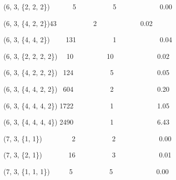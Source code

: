 \documentclass{article}
\newenvironment{tmparmod}[3]{\begin{list}{}{\setlength{\topsep}{0pt}\setlength{\leftmargin}{#1}\setlength{\rightmargin}{#2}\setlength{\parindent}{#3}\setlength{\listparindent}{\parindent}\setlength{\itemindent}{\parindent}\setlength{\parsep}{\parskip}} \item[]}{\end{list}}
\begin{document}
\begin{tmparmod}{0pt}{0pt}{0tab}
\begin{tmbothlined}
{{    {\hspace{3em}}(6, 3, \{2, 2, 2\}) \ \ \ \ \ \ {\hspace{4em}}5 \ \ \ \ \ \
    \ \ \ \ 5 \ \ \ \ \ \ \ \ \ \ \ \ 0.00
    
    {\hspace{3em}}(6, 3, \{4, 2, 2\}){\hspace{7em}}43 \ \ \ \ \ \ \ \ \ \ 2 \
    \ \ \ \ \ \ \ \ \ \ \ 0.02
    
    {\hspace{3em}}(6, 3, \{4, 4, 2\}) \ \ \ \ {\hspace{4em}}131 \ \ \ \ \ \ \
    \ \ \ 1 \ \ \ \ \ \ \ \ \ \ \ \ 0.04
    
    {\hspace{3em}}(6, 3, \{2, 2, 2, 2\}) \ \ {\hspace{4em}}10 \ \ \ \ \ \ \ \
    \ 10 \ \ \ \ \ \ \ \ \ \ \ \ 0.02
    
    {\hspace{3em}}(6, 3, \{4, 2, 2, 2\}) \ {\hspace{4em}}124 \ \ \ \ \ \ \ \ \
    \ 5 \ \ \ \ \ \ \ \ \ \ \ \ 0.05
    
    {\hspace{3em}}(6, 3, \{4, 4, 2, 2\}) \ {\hspace{4em}}604 \ \ \ \ \ \ \ \ \
    \ 2 \ \ \ \ \ \ \ \ \ \ \ \ 0.20
    
    {\hspace{3em}}(6, 3, \{4, 4, 4, 2\}) {\hspace{4em}}1722 \ \ \ \ \ \ \ \ \
    \ 1 \ \ \ \ \ \ \ \ \ \ \ \ 1.05
    
    {\hspace{3em}}(6, 3, \{4, 4, 4, 4\}) {\hspace{4em}}2490 \ \ \ \ \ \ \ \ \
    \ 1 \ \ \ \ \ \ \ \ \ \ \ \ 6.43
    
    {\hspace{3em}}(7, 3, \{1, 1\}) \ \ \ \quad \ \ \ \ \ {\hspace{3em}}2 \ \ \
    \ \ \ \ \ \ \ 2 \ \ \ \ \ \ \ \ \ \ \ \ 0.00
    
    {\hspace{3em}}(7, 3, \{2, 1\}) \ \ \ \ \ \quad \ \ {\hspace{3em}}16 \ \ \
    \ \ \ \ \ \ \ 3 \ \ \ \ \ \ \ \ \ \ \ \ 0.01
    
    {\hspace{3em}}(7, 3, \{1, 1, 1\}) \ \ \ \ \quad \ {\hspace{3em}}5 \ \ \ \
    \ \ \ \ \ \ 5 \ \ \ \ \ \ \ \ \ \ \ \ 0.00
    
}}
\end{tmbothlined}
\end{tmparmod}
\end{document}
